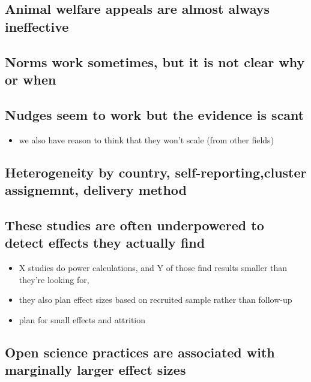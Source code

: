\documentclass[sn-nature,pdflatex]{sn-jnl}
\providecommand{\tightlist}{%
  \setlength{\itemsep}{0pt}\setlength{\parskip}{0pt}}
\begin{document}
\subsection{Animal welfare appeals are almost always
ineffective}\label{animal-welfare-appeals-are-almost-always-ineffective}

\subsection{Norms work sometimes, but it is not clear why or
when}\label{norms-work-sometimes-but-it-is-not-clear-why-or-when}

\subsection{Nudges seem to work but the evidence is
scant}\label{nudges-seem-to-work-but-the-evidence-is-scant}

\begin{itemize}
\tightlist
\item
  we also have reason to think that they won't scale (from other fields)
\end{itemize}

\subsection{Heterogeneity by country, self-reporting,cluster assignemnt,
delivery
method}\label{heterogeneity-by-country-self-reportingcluster-assignemnt-delivery-method}

\subsection{These studies are often underpowered to detect effects they
actually
find}\label{these-studies-are-often-underpowered-to-detect-effects-they-actually-find}

\begin{itemize}
\tightlist
\item
  X studies do power calculations, and Y of those find results smaller
  than they're looking for,
\item
  they also plan effect sizes based on recruited sample rather than
  follow-up
\item
  plan for small effects and attrition
\end{itemize}

\subsection{Open science practices are associated with marginally larger
effect
sizes}\label{open-science-practices-are-associated-with-marginally-larger-effect-sizes}
\end{document}
